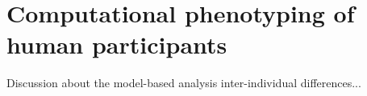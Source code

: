 \documentclass[12pt,english]{article}%
\newcommand{\citep}[1]{\parencite{#1}}
\newcommand{\citet}[1]{\textcite{#1}}
\newcommand{\AM}[1]{\textbf{\textcolor{blue}{[AM: #1]}}}
\begin{document}
\section{Computational phenotyping of human participants}
Discussion about the model-based analysis inter-individual differences...

\end{document}
